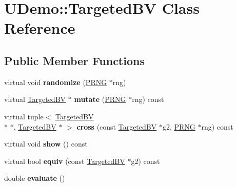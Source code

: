 \hypertarget{class_u_demo_1_1_targeted_b_v}{\section{U\-Demo\-:\-:Targeted\-B\-V Class Reference}
\label{class_u_demo_1_1_targeted_b_v}
}
\subsection*{Public Member Functions}
\begin{DoxyCompactItemize}
\item 
\hypertarget{class_u_demo_1_1_targeted_b_v_a5a9f4b466a1d8c2ec41350fec65e9c31}{virtual void {\bfseries randomize} (\hyperlink{class_k_base_1_1_p_r_n_g}{P\-R\-N\-G} $\ast$rng)}\label{class_u_demo_1_1_targeted_b_v_a5a9f4b466a1d8c2ec41350fec65e9c31}

\item 
\hypertarget{class_u_demo_1_1_targeted_b_v_aa3b7e42fd5ed918d1d4d11b51ab1e434}{virtual \hyperlink{class_u_demo_1_1_targeted_b_v}{Targeted\-B\-V} $\ast$ {\bfseries mutate} (\hyperlink{class_k_base_1_1_p_r_n_g}{P\-R\-N\-G} $\ast$rng) const }\label{class_u_demo_1_1_targeted_b_v_aa3b7e42fd5ed918d1d4d11b51ab1e434}

\item 
\hypertarget{class_u_demo_1_1_targeted_b_v_a0c0fe1016dc3c82dfbfc0c1a2dcaf657}{virtual tuple$<$ \hyperlink{class_u_demo_1_1_targeted_b_v}{Targeted\-B\-V} \\*
$\ast$, \hyperlink{class_u_demo_1_1_targeted_b_v}{Targeted\-B\-V} $\ast$ $>$ {\bfseries cross} (const \hyperlink{class_u_demo_1_1_targeted_b_v}{Targeted\-B\-V} $\ast$g2, \hyperlink{class_k_base_1_1_p_r_n_g}{P\-R\-N\-G} $\ast$rng) const }\label{class_u_demo_1_1_targeted_b_v_a0c0fe1016dc3c82dfbfc0c1a2dcaf657}

\item 
\hypertarget{class_u_demo_1_1_targeted_b_v_af067b5a2d86ecc68dc9c699e88cda892}{virtual void {\bfseries show} () const }\label{class_u_demo_1_1_targeted_b_v_af067b5a2d86ecc68dc9c699e88cda892}

\item 
\hypertarget{class_u_demo_1_1_targeted_b_v_ad4ad679c46e696a7bcd6e14416e14887}{virtual bool {\bfseries equiv} (const \hyperlink{class_u_demo_1_1_targeted_b_v}{Targeted\-B\-V} $\ast$g2) const }\label{class_u_demo_1_1_targeted_b_v_ad4ad679c46e696a7bcd6e14416e14887}

\item 
\hypertarget{class_u_demo_1_1_targeted_b_v_a73d1682bfb09b5aebab8c29baf99c760}{double {\bfseries evaluate} ()}\label{class_u_demo_1_1_targeted_b_v_a73d1682bfb09b5aebab8c29baf99c760}


\end{DoxyCompactItemize}
